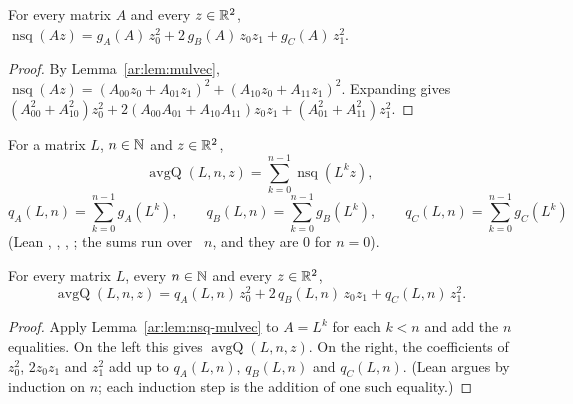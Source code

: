 \begin{lemma}\label{ar:lem:nsq-mulvec}
For every matrix $A$ and every $z\in\mathbb R^2$,
$\operatorname{nsq}(Az)=g_A(A)\,z_0^2+2\,g_B(A)\,z_0z_1+g_C(A)\,z_1^2$.
\end{lemma}

\begin{proof}
By Lemma~\ref{ar:lem:mulvec}, $\operatorname{nsq}(Az)=(A_{00}z_0+A_{01}z_1)^2+(A_{10}z_0+A_{11}z_1)^2$. Expanding gives
$(A_{00}^2+A_{10}^2)z_0^2+2(A_{00}A_{01}+A_{10}A_{11})z_0z_1+(A_{01}^2+A_{11}^2)z_1^2$.
\end{proof}

\begin{definition}\label{ar:def:avgq}
For a matrix $L$, $n\in\mathbb N$ and $z\in\mathbb R^2$,
\[
\operatorname{avgQ}(L,n,z)=\sum_{k=0}^{n-1}\operatorname{nsq}(L^kz),
\]
\[
q_A(L,n)=\sum_{k=0}^{n-1}g_A(L^k),\qquad q_B(L,n)=\sum_{k=0}^{n-1}g_B(L^k),\qquad q_C(L,n)=\sum_{k=0}^{n-1}g_C(L^k)
\]
(Lean , , , ; the sums run over ~$n$, and they are $0$ for
$n=0$).
\end{definition}

\begin{lemma}\label{ar:lem:avgq-eq}
For every matrix $L$, every $n\in\mathbb N$ and every $z\in\mathbb R^2$,
\[
\operatorname{avgQ}(L,n,z)=q_A(L,n)\,z_0^2+2\,q_B(L,n)\,z_0z_1+q_C(L,n)\,z_1^2 .
\]
\end{lemma}

\begin{proof}
Apply Lemma~\ref{ar:lem:nsq-mulvec} to $A=L^k$ for each $k<n$ and add the $n$ equalities. On the left this gives
$\operatorname{avgQ}(L,n,z)$. On the right, the coefficients of $z_0^2$, $2z_0z_1$ and $z_1^2$ add up to $q_A(L,n)$,
$q_B(L,n)$ and $q_C(L,n)$. (Lean argues by induction on $n$; each induction step is the addition of one such
equality.)
\end{proof}

